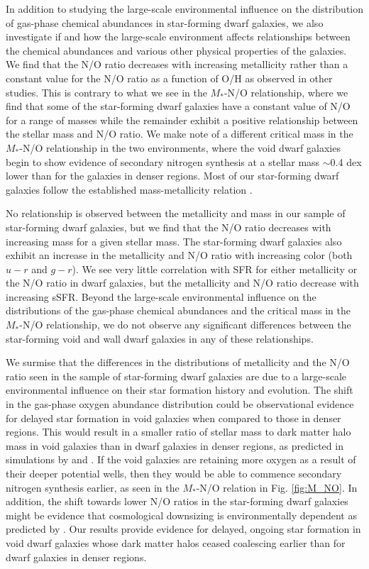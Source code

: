 In addition to studying the large-scale environmental influence on the 
distribution of gas-phase chemical abundances in star-forming dwarf galaxies, we 
also investigate if and how the large-scale environment affects relationships 
between the chemical abundances and various other physical properties of the 
galaxies.  We find that the N/O ratio decreases with increasing metallicity 
rather than a constant value for the N/O ratio as a function of O/H as observed 
in other studies.  This is contrary to what we see in the $M_*$-N/O 
relationship, where we find that some of the star-forming dwarf galaxies have a 
constant value of N/O for a range of masses while the remainder exhibit a 
positive relationship between the stellar mass and N/O ratio.  We make note of a 
different critical mass in the $M_*$-N/O relationship in the two environments, 
where the void dwarf galaxies begin to show evidence of secondary nitrogen 
synthesis at a stellar mass $\sim$0.4 dex lower than for the galaxies in denser 
regions.  Most of our star-forming dwarf galaxies follow the established 
mass-metallicity relation \citep[e.g.,][]{Tremonti04}.

No relationship is observed between the metallicity and  mass in our 
sample of star-forming dwarf galaxies, but we find that the N/O ratio decreases 
with increasing  mass for a given stellar mass.  The star-forming 
dwarf galaxies also exhibit an increase in the metallicity and N/O ratio with 
increasing color (both $u-r$ and $g-r$).  We see very little correlation with 
SFR for either metallicity or the N/O ratio in dwarf galaxies, but the 
metallicity and N/O ratio decrease with increasing sSFR.  Beyond the large-scale 
environmental influence on the distributions of the gas-phase chemical 
abundances and the critical mass in the $M_*$-N/O relationship, we do not 
observe any significant differences between the star-forming void and wall dwarf 
galaxies in any of these relationships.

We surmise that the differences in the distributions of metallicity and the N/O 
ratio seen in the sample of star-forming dwarf galaxies are due to a large-scale 
environmental influence on their star formation history and evolution.  The 
shift in the gas-phase oxygen abundance distribution could be observational 
evidence for delayed star formation in void galaxies when compared to those in 
denser regions.  This would result in a smaller ratio of stellar mass to dark 
matter halo mass in void galaxies than in dwarf galaxies in denser regions, as 
predicted in simulations by \cite{Jung14} and \cite{Tonnesen15}.  If the void 
galaxies are retaining more oxygen as a result of their deeper potential wells, 
then they would be able to commence secondary nitrogen synthesis earlier, as 
seen in the $M_*$-N/O relation in Fig. \ref{fig:M_NO}.  In addition, the shift 
towards lower N/O ratios in the star-forming dwarf galaxies might be evidence 
that cosmological downsizing is environmentally dependent as predicted by 
\cite{Cen11}.  Our results provide evidence for delayed, ongoing star formation 
in void dwarf galaxies whose dark matter halos ceased coalescing earlier than 
for dwarf galaxies in denser regions.


